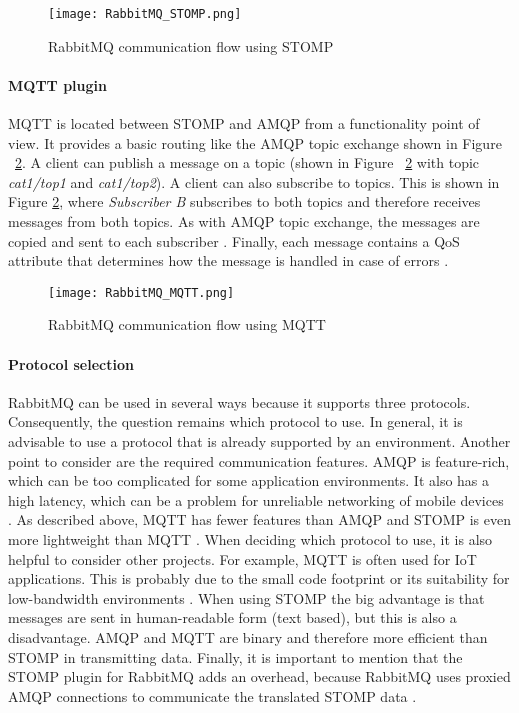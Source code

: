 \begin{figure}
	\centering
	\texttt{[image: RabbitMQ\_STOMP.png]}
	\caption{RabbitMQ communication flow using STOMP}
	\label{img:rabbitmqstomp}
\end{figure}

\paragraph{MQTT plugin}

\ac{MQTT} is located between \ac{STOMP} and \ac{AMQP} from a functionality point of view.
It provides a basic routing like the \ac{AMQP} topic exchange shown in Figure ~\ref{img:rabbitmqmqtt}.
A client can publish a message on a topic (shown in Figure ~\ref{img:rabbitmqmqtt} with topic \textit{cat1/top1} and \textit{cat1/top2}).
A client can also subscribe to topics.
This is shown in Figure \ref{img:rabbitmqmqtt}, where \textit{Subscriber B} subscribes to both topics and therefore receives messages from both topics.
As with \ac{AMQP} topic exchange, the messages are copied and sent to each subscriber \cite[p.~4ff.]{Hillar.2017}\cite{AndrewBanks.2014}.
Finally, each message contains a \acf{QoS} attribute that determines how the message is handled in case of errors \cite{AndrewBanks.2014}.

\begin{figure}
	\centering
	\texttt{[image: RabbitMQ\_MQTT.png]}
	\caption{RabbitMQ communication flow using MQTT}
	\label{img:rabbitmqmqtt}
\end{figure}

\paragraph{Protocol selection}

RabbitMQ can be used in several ways because it supports three protocols.
Consequently, the question remains which protocol to use.
In general, it is advisable to use a protocol that is already supported by an environment.
Another point to consider are the required communication features.
\ac{AMQP} is feature-rich, which can be too complicated for some application environments.
It also has a high latency, which can be a problem for unreliable networking of mobile devices \cite[p. 177]{Roy.2018}.
As described above, \ac{MQTT} has fewer features than \ac{AMQP} and \ac{STOMP} is even more lightweight than \ac{MQTT} \cite[p. 189]{Roy.2018}.
When deciding which protocol to use, it is also helpful to consider other projects.
For example, \ac{MQTT} is often used for \ac{IoT} applications.
This is probably due to the small code footprint or its suitability for low-bandwidth environments \cite[p. 178]{Roy.2018}\cite{AndrewBanks.2014}.
When using \ac{STOMP} the big advantage is that messages are sent in human-readable form (text based), but this is also a disadvantage.
\ac{AMQP} and \ac{MQTT} are binary and therefore more efficient than \ac{STOMP} in transmitting data.
Finally, it is important to mention that the \ac{STOMP} plugin for RabbitMQ adds an overhead, because RabbitMQ uses proxied \ac{AMQP} connections to communicate the translated \ac{STOMP} data \cite[p. 200]{Roy.2018}.

